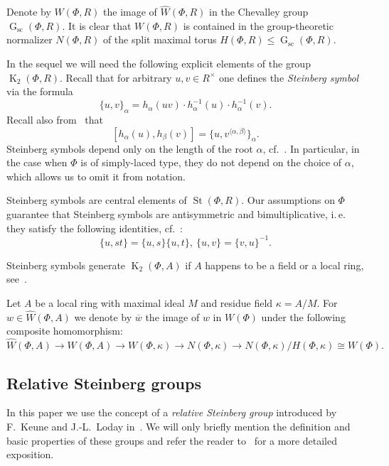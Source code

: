 \documentclass[oneside, 10pt]{amsart}
\DeclareMathOperator{\St}{St}
\DeclareMathOperator{\G}{G}
\newcommand{\Gsc}{\G_\mathrm{sc}}
\DeclareMathOperator{\K}{K}
\newcommand{\StW}{\widehat{W}}
\numberwithin{equation}{section}
\numberwithin{thm}{section}
\numberwithin{lemma}{section}
\theoremstyle{definition}
\theoremstyle{remark}
\begin{document}
Denote by $W(\Phi, R)$ the image of $\StW(\Phi, R)$ in the Chevalley group $\Gsc(\Phi, R)$.
It is clear that $W(\Phi, R)$ is contained in the group-theoretic normalizer $N(\Phi, R)$ of the split maximal torus $H(\Phi, R) \leq \Gsc(\Phi, R)$.

In the sequel we will need the following explicit elements of the group $\K_2(\Phi, R)$.
Recall that for arbitrary $u, v \in R^\times$ one defines the \textit{Steinberg symbol} via the formula
\begin{equation} \label{eq:steinberg} \{ u, v \}_\alpha = h_\alpha(uv) \cdot h_\alpha^{-1}(u) \cdot h_\alpha^{-1}(v). \end{equation}
Recall also from~\cite[Lemme~5.4]{Ma69} that
\begin{equation} \label{eq:steinberg-2} [h_\alpha(u), h_\beta(v)] = \{u, v^{\langle \alpha, \beta \rangle}\}_\alpha. \end{equation}
Steinberg symbols depend only on the length of the root $\alpha$, cf.~\cite[pp.~26--28]{Ma69}.
In particular, in the case when $\Phi$ is of simply-laced type, they do not depend on the choice of $\alpha$, which allows us to omit it from notation.

Steinberg symbols are central elements of $\St(\Phi, R)$.
Our assumptions on $\Phi$ guarantee that Steinberg symbols are antisymmetric and bimultiplicative, i.\,e. they satisfy the following identities, cf.~\cite[Lemme~2.4]{Ma69}:
\begin{equation} \label{eq:symbol-properties} \{ u, st \} = \{ u, s\} \{ u, t \}, \ \{ u, v \} = \{ v, u\}^{-1}. \end{equation}

Steinberg symbols generate $\K_2(\Phi, A)$ if $A$ happens to be a field or a local ring, see~\cite[Theorem~2.13]{Ste73}.

Let $A$ be a local ring with maximal ideal $M$ and residue field $\kappa = A/M$.
For $w \in \StW(\Phi, A)$ we denote by $\overline{w}$ the image of $w$ in $W(\Phi)$ under the following composite homomorphism:
\[ \StW(\Phi, A) \to W(\Phi, A) \to W(\Phi, \kappa) \to N(\Phi, \kappa) \to N(\Phi, \kappa) / H(\Phi, \kappa) \cong W(\Phi). \]

\subsection{Relative Steinberg groups} \label{subsec:another-presentation}
In this paper we use the concept of a \textit{relative Steinberg group} introduced by F.~Keune and J.-L.~Loday in~\cite{Ke78, Lo78}.
We will only briefly mention the definition and basic properties of these groups and refer the reader to~\cite[\S~2.3]{LS20} for a more detailed exposition.
\end{document}
